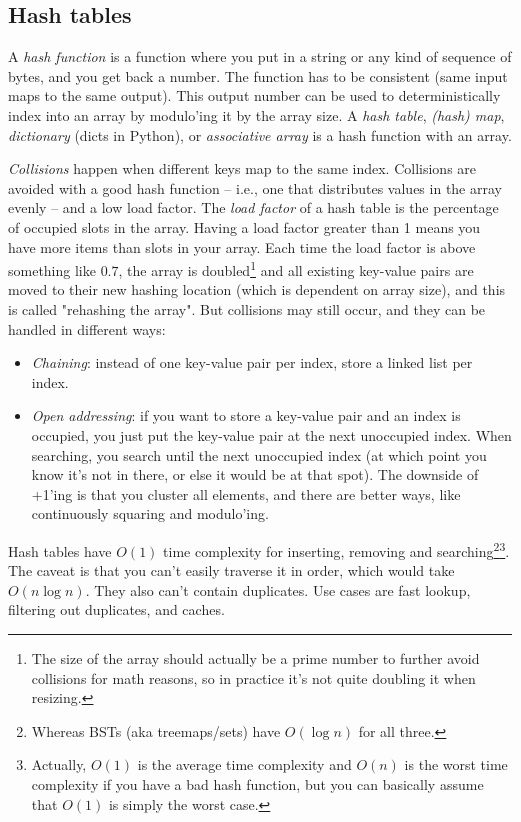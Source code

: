 \documentclass[8pt, table, xcdraw]{article}%
\begin{document}
\subsection{Hash tables}

A \emph{hash function} is a function where you put in a string or any kind of sequence of bytes, and you get back a number. The function has to be consistent (same input maps to the same output). This output number can be used to deterministically index into an array by modulo'ing it by the array size. A \emph{hash table}, \emph{(hash) map}, \emph{dictionary} (dicts in Python), or \emph{associative array} is a hash function with an array.

\emph{Collisions} happen when different keys map to the same index. Collisions are avoided with a good hash function -- i.e., one that distributes values in the array evenly -- and a low load factor. The \emph{load factor} of a hash table is the percentage of occupied slots in the array. Having a load factor greater than 1 means you have more items than slots in your array. Each time the load factor is above something like $0.7$, the array is doubled\footnote{The size of the array should actually be a prime number to further avoid collisions for math reasons, so in practice it's not quite doubling it when resizing.} and all existing key-value pairs are moved to their new hashing location (which is dependent on array size), and this is called "rehashing the array". But collisions may still occur, and they can be handled in different ways:

\begin{itemize}
    \item \emph{Chaining}: instead of one key-value pair per index, store a linked list per index.
    \item \emph{Open addressing}: if you want to store a key-value pair and an index is occupied, you just put the key-value pair at the next unoccupied index. When searching, you search until the next unoccupied index (at which point you know it's not in there, or else it would be at that spot). The downside of +1'ing is that you cluster all elements, and there are better ways, like continuously squaring and modulo'ing.
\end{itemize}

Hash tables have $O(1)$ time complexity for inserting, removing and searching\footnote{Whereas BSTs (aka treemaps/sets) have $O(\log n)$ for all three.}\footnote{Actually, $O(1)$ is the average time complexity and $O(n)$ is the worst time complexity if you have a bad hash function, but you can basically assume that $O(1)$ is simply the worst case.}. The caveat is that you can't easily traverse it in order, which would take $O(n \log n)$. They also can't contain duplicates. Use cases are fast lookup, filtering out duplicates, and caches.
\end{document}
